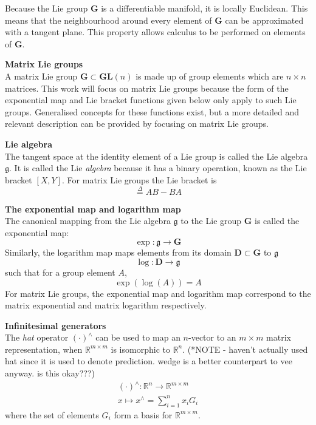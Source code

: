 		Because the Lie group $\mathbf{G}$ is a differentiable manifold, it is locally Euclidean. This means that the neighbourhood around every element of $\mathbf{G}$ can be approximated with a tangent plane. This property allows calculus to be performed on elements of $\mathbf{G}$.
		
		\textbf{Matrix Lie groups}\\
			A matrix Lie group $\mathbf{G} \subset \mathbf{GL}(n)$ is made up of group elements which are $n \times n$ matrices.
			This work will focus on matrix Lie groups because the form of the exponential map and Lie bracket functions given below only apply to such Lie groups. Generalised concepts for these functions exist, but a more detailed and relevant description can be provided by focusing on matrix Lie groups.
		
		\textbf{Lie algebra}\\
			The tangent space at the identity element of a Lie group is called the Lie algebra $\mathfrak{g}$. It is called the Lie \textit{algebra} because it has a binary operation, known as the Lie bracket $[X,Y]$. For matrix Lie groups the Lie bracket is
			\begin{equation}
				[A,B] \stackrel{\Delta}{=} AB-BA
			\end{equation}
			
		\textbf{The exponential map and logarithm map}\\		
			The canonical mapping from the Lie algebra $\mathfrak{g}$ to the Lie group $\mathbf{G}$ is called the exponential map:
			\begin{equation}
				\exp: \mathfrak{g} \rightarrow \mathbf{G}
			\end{equation}			
			Similarly, the logarithm map maps elements from its domain $\mathbf{D} \subset \mathbf{G}$ to $\mathfrak{g}$
			\begin{equation}
				\log: \mathbf{D} \rightarrow \mathfrak{g}
			\end{equation}
			such that for a group element $A$,
			\begin{equation}
				\exp(\log(A)) = A
			\end{equation}
			For matrix Lie groups, the exponential map and logarithm map correspond to the matrix exponential and matrix logarithm respectively.
						
		\textbf{Infinitesimal generators}\\
			The \textit{hat} operator $(\cdot)^{\wedge}$ can be used to map an $n$-vector to an $m \times m$ matrix representation, when $\mathbb{R}^{m \times m}$ is isomorphic to $\mathbb{R}^n$. (*NOTE - haven't actually used hat since it is used to denote prediction. wedge is a better counterpart to vee anyway. is this okay???)
			\begin{equation}
				\begin{split}
					(\cdot)^{\wedge}: \mathbb{R}^n \rightarrow \mathbb{R}^{m \times m}\\
					x \mapsto x^{\wedge} = \sum\limits_{i=1}^n x_iG_i
				\end{split}
			\end{equation}
			where the set of elements $G_i$ form a basis for $\mathbb{R}^{m \times m}$.
			
